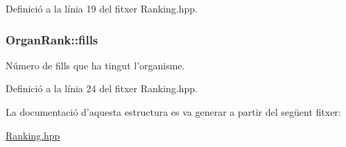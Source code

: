 Definició a la línia 19 del fitxer Ranking.\-hpp.

\hypertarget{struct_organ_rank_ac822919ccf32979e8c4d8384a1949b08}{
\subsubsection[{fills}]{\setlength{\rightskip}{0pt plus 5cm}Organ\-Rank\-::fills}}\label{struct_organ_rank_ac822919ccf32979e8c4d8384a1949b08}


Número de fills que ha tingut l'organisme. 



Definició a la línia 24 del fitxer Ranking.\-hpp.



La documentació d'aquesta estructura es va generar a partir del següent fitxer\-:\begin{DoxyCompactItemize}
\item 
\hyperlink{_ranking_8hpp}{Ranking.\-hpp}\end{DoxyCompactItemize}
